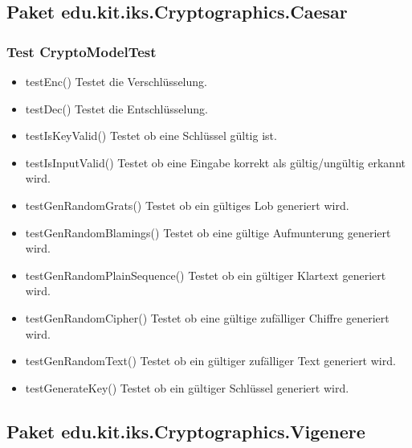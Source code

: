 \documentclass{article}
\begin{document}
  \subsection{Paket edu.kit.iks.Cryptographics.Caesar}
  \subsubsection{Test CryptoModelTest}
  \begin{itemize}
    \item testEnc()\newline
          Testet die Verschlüsselung.
    \item testDec()\newline
          Testet die Entschlüsselung.
    \item testIsKeyValid()\newline
          Testet ob eine Schlüssel gültig ist.
    \item testIsInputValid()\newline
          Testet ob eine Eingabe korrekt als gültig/ungültig erkannt wird.
    \item testGenRandomGrats()\newline
          Testet ob ein gültiges Lob generiert wird.
    \item testGenRandomBlamings()\newline
          Testet ob eine gültige Aufmunterung generiert wird.
    \item testGenRandomPlainSequence()\newline
          Testet ob ein gültiger Klartext generiert wird.
    \item testGenRandomCipher()\newline
          Testet ob eine gültige zufälliger Chiffre generiert wird.
    \item testGenRandomText()\newline
          Testet ob ein gültiger zufälliger Text generiert wird.
    \item testGenerateKey()\newline
          Testet ob ein gültiger Schlüssel generiert wird.
	\end{itemize}

  \subsection{Paket edu.kit.iks.Cryptographics.Vigenere}
\end{document}
